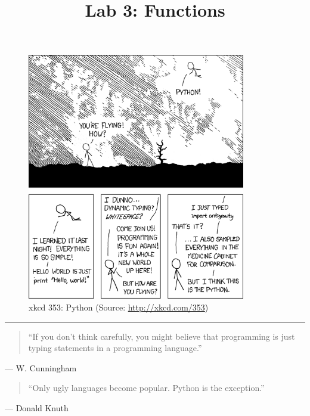 \documentclass[11pt]{cselabheader}
\title{Lab 3: Functions}
\begin{document}

\maketitle

\begin{figure}[H]
  \centering
  \includegraphics[width=0.85\textwidth]{img/xkcd_python.png}
  \caption{xkcd 353: Python (Source: \url{http://xkcd.com/353})}
\end{figure}

\pagebreak
\hrule

\begin{quotation}
``If you don't think carefully, you might believe that programming is just
typing statements in a programming language.''
\end{quotation}
\begin{flushright}
  --- W. Cunningham
\end{flushright}


\begin{quotation}
``Only ugly languages become popular. Python is the exception.''
\end{quotation}
\begin{flushright}
  --- Donald Knuth
\end{flushright}
\end{document}

